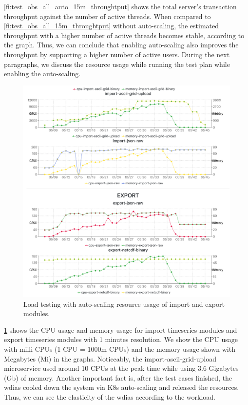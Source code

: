 \cref{fi:test_obs_all_auto_15m_throughtput} shows the total server's transaction throughput against the number of active threads. When compared to \cref{fi:test_obs_all_15m_throughtput} without auto-scaling, the estimated throughput with a higher number of active threads becomes stable, according to the graph. Thus, we can conclude that enabling auto-scaling also improves the throughput by supporting a higher number of active users. During the next paragraphs, we discuss the resource usage while running the test plan while enabling the auto-scaling.

\begin{figure}[htp]
    \centering
    \includegraphics[width=1.0\textwidth]{results/obs/all_auto/obs_all_auto_15m_import_export_res.png}
    \caption{Load testing with auto-scaling resource usage of import and export modules.}
    \label{fi:obs_all_auto_15m_import_export_res}
\end{figure}

\cref{fi:obs_all_auto_15m_import_export_res} shows the CPU usage and memory usage for import timeseries modules and export timeseries modules with 1 minutes resolution. We show the CPU usage with milli CPUs \cite{LinuxFoundationManagingKubernetes} (1 CPU = 1000m CPUs) and the memory usage shown with Megabytes (Mi) \cite{LinuxFoundationManagingKubernetes} in the graphs. Noticeably, the import-ascii-grid-upload microservice used around 10 CPUs at the peak time while using 3.6 Gigabytes (Gb) of memory. Another important fact is, after the test cases finished, the \acrshort{wdias} cooled down the system via K8s auto-scaling and released the resources. Thus, we can see the elasticity of the \acrshort{wdias} according to the workload.

